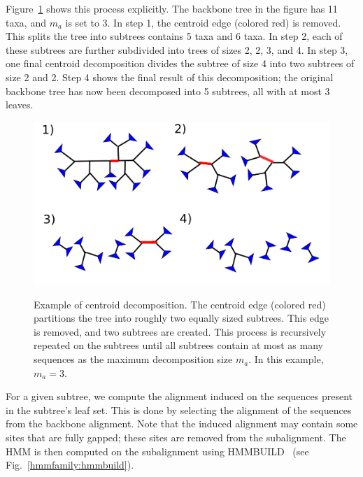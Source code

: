 Figure~\ref{hmmfamily:decomp} shows this process explicitly.  The backbone tree in the figure has 11 taxa, and $m_a$ is set to 3.  In step 1, the centroid edge (colored red) is removed.  This splits the tree into subtrees contains 5 taxa and 6 taxa.  In step 2, each of these subtrees are further subdivided into trees of sizes 2, 2, 3, and 4.  In step 3, one final centroid decomposition divides the subtree of size 4 into two subtrees of size 2 and 2.  Step 4 shows the final result of this decomposition; the original backbone tree has now been decomposed into 5 subtrees, all with at most 3 leaves.

\begin{figure}[htbp]
\centering
{\includegraphics[width=.750\textwidth]{hmmfamily/decomposition_2}}
\caption[Example of centroid decomposition.]{Example of centroid decomposition.  The centroid edge (colored red) partitions the tree into roughly two equally sized subtrees.  This edge is removed, and two subtrees are created.  This process is recursively repeated on the subtrees until all subtrees contain at most as many sequences as the maximum decomposition size $m_a$.  In this example, $m_a=3$.} 
\label{hmmfamily:decomp}
\end{figure}

For a given subtree, we compute the alignment induced on the sequences present in the subtree's leaf set.  This is done by selecting the alignment of the sequences from the backbone alignment.  Note that the induced alignment may contain some sites that are fully gapped; these sites are removed from the subalignment.  The HMM is then computed on the subalignment using HMMBUILD~\cite{hmmer} (see Fig.~\ref{hmmfamily:hmmbuild}).

